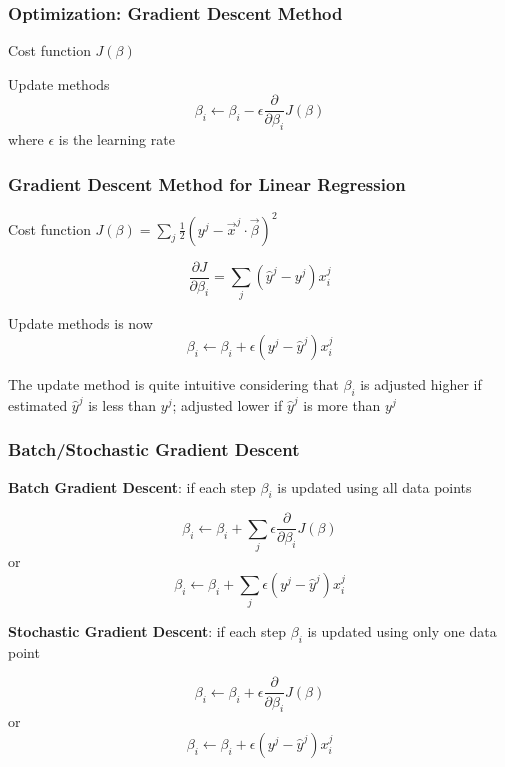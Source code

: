 \documentclass[notheorems, aspectratio=54]{beamer}
\begin{document}
\begin{frame}

\frametitle{Optimization: Gradient Descent Method}
Cost function $J(\beta)$

Update methods
$$\beta_i\leftarrow \beta_i-\epsilon\frac{\partial}{\partial\beta_i}J(\beta)$$
where $\epsilon$ is the learning rate
\end{frame}	


\begin{frame}

\frametitle{Gradient Descent Method for Linear Regression}
Cost function $J(\beta)=\sum_j\frac{1}{2}(y^j-\vec{x}^j\cdot\vec{\beta})^2$

$$\frac{\partial J}{\partial \beta_i}=\sum_j(\hat{y}^j-y^j)x_i^j$$

Update methods is now
$$\beta_i\leftarrow \beta_i+\epsilon(y^j-\hat{y}^j)x_i^j$$

The update method is quite intuitive considering that $\beta_i$ is adjusted higher if estimated $\hat{y}^j$ is less than $y^j$; adjusted lower if $\hat{y}^j$ is more than $y^j$

\end{frame}	


\begin{frame}

\frametitle{Batch/Stochastic Gradient Descent}
\textbf{Batch Gradient Descent}: if each step $\beta_i$ is updated using all data points

$$\beta_i\leftarrow \beta_i+\sum_j\epsilon\frac{\partial}{\partial\beta_i}J(\beta)$$ or
$$\beta_i\leftarrow \beta_i+\sum_j\epsilon(y^j-\hat{y}^j)x_i^j$$


\textbf{Stochastic Gradient Descent}: if each step $\beta_i$ is updated using only one data point

$$\beta_i\leftarrow \beta_i+\epsilon\frac{\partial}{\partial\beta_i}J(\beta)$$ or
$$\beta_i\leftarrow \beta_i+\epsilon(y^j-\hat{y}^j)x_i^j$$


\end{frame}	
\end{document}
